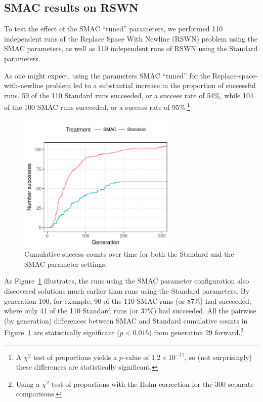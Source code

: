 \subsection{SMAC results on RSWN}
\label{sec:SMACresultsRSWN}

To test the effect of the SMAC ``tuned'' parameters, we performed 110
independent runs of the Replace Space With Newline (RSWN) problem using the
SMAC parameters, as well as 110 independent runs of RSWN using the
Standard parameters.

As one might expect, using the parameters SMAC ``tuned'' for the
Replace-space-with-newline problem led to a 
substantial increase in the proportion of successful runs. 59 of 
the 110 Standard runs succeeded, or a success rate of 54\%, while 104 of the
100 SMAC runs succeeded, or a success rate of 95\%.\footnote{A $\chi^2$ test of 
proportions yields a $p$-value of $1.2 \times 10^{-11}$, so (not surprisingly)
these differences are statistically significant.}

\begin{figure}
	\includegraphics[width=3in]{../figures/successGenerations}
	\caption{Cumulative success counts over time for both the Standard
	and the SMAC parameter settings.}
	\label{fig:successGenerations}
\end{figure}

As Figure~\ref{fig:successGenerations} illustrates, the runs using the SMAC
parameter configuration also discovered solutions much earlier than runs using
the Standard parameters. By generation 100, for example, 90 of the 110 SMAC 
runs (or 87\%) had succeeded, where only 41 of the 110 Standard runs 
(or 37\%) had succeeded. All the pairwise (by generation) differences 
between SMAC and Standard cumulative counts in 
Figure~\ref{fig:successGenerations} are 
statistically significant ($p<0.015$)
from generation 29 forward.\footnote{Using a $\chi^2$ test of proportions 
	with the Holm correction for the 300 separate comparisons.}


